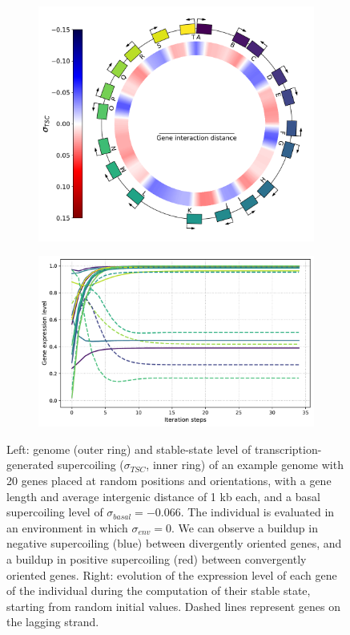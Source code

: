 \begin{figure}[H]
  \centering
  \begin{subfigure}[t]{0.44\textwidth}
    \includegraphics[width=\textwidth]{ploscb/img/random_genome_and_tsc.pdf}
    \label{subfig:random_genome}
  \end{subfigure}
  \begin{subfigure}[t]{0.55\textwidth}
    \includegraphics[width=\textwidth]{ploscb/img/random_gene_expr.pdf}
    \label{subfig:random_expr}
  \end{subfigure}
  \caption{Left: genome (outer ring) and stable-state level of transcription-generated supercoiling ($\sigma_{TSC}$, inner ring) of an example genome with 20 genes placed at random positions and orientations, with a gene length and average intergenic distance of 1 kb each, and a basal supercoiling level of $\sigma_{basal} = -0.066$.
  The individual is evaluated in an environment in which $\sigma_{env} = 0$.
  We can observe a buildup in negative supercoiling (blue) between divergently oriented genes, and a buildup in positive supercoiling (red) between convergently oriented genes.
  Right: evolution of the expression level of each gene of the individual during the computation of their stable state, starting from random initial values.
  Dashed lines represent genes on the lagging strand.}
  \label{fig:random_indiv}
\end{figure}

